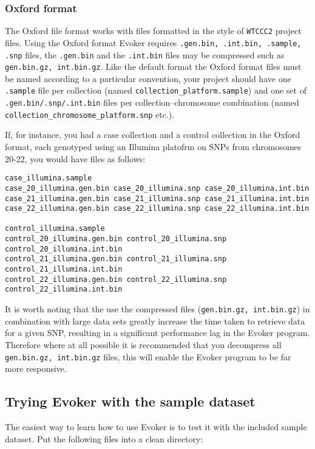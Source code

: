 \documentclass{article}
\begin{document}
\subsubsection{Oxford format}
The Oxford file format works with files formatted in the style of \texttt{WTCCC2} project files. Using the Oxford format Evoker requires \texttt{.gen.bin, .int.bin, .sample, .snp} files, the \texttt{.gen.bin} and the \texttt{.int.bin} files may be compressed such as \texttt{gen.bin.gz, int.bin.gz}. Like the default format the Oxford format files must be named according to a particular convention, your project should have one \texttt{.sample} file per collection (named \texttt{collection\_platform.sample}) and one set of \texttt{.gen.bin/.snp/.int.bin} files per collection--chromosome combination (named \texttt{collection\_chromosome\_platform.snp} etc.). 

If, for instance, you had a case collection and a control collection in the Oxford format, each genotyped using an Illumina platofrm on SNPs from chromosomes 20-22, you would have files as follows:

\begin{verbatim}
case_illumina.sample
case_20_illumina.gen.bin case_20_illumina.snp case_20_illumina.int.bin 
case_21_illumina.gen.bin case_21_illumina.snp case_21_illumina.int.bin 
case_22_illumina.gen.bin case_22_illumina.snp case_22_illumina.int.bin

control_illumina.sample
control_20_illumina.gen.bin control_20_illumina.snp control_20_illumina.int.bin 
control_21_illumina.gen.bin control_21_illumina.snp control_21_illumina.int.bin 
control_22_illumina.gen.bin control_22_illumina.snp control_22_illumina.int.bin
\end{verbatim}

It is worth noting that the use the compressed files (\texttt{gen.bin.gz, int.bin.gz}) in combination with large data sets greatly increase the time taken to retrieve data for a given SNP, resulting in a significant performance lag in the Evoker program. Therefore where at all possible it is recommended that you decompress all \texttt{gen.bin.gz, int.bin.gz} files, this will enable the Evoker program to be far more responsive.

\subsection{Trying Evoker with the sample dataset}

The easiest way to learn how to use Evoker is to test it with the included sample dataset. Put the following files into a clean directory:
\end{document}
